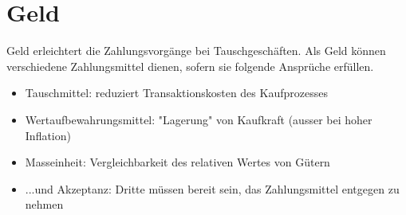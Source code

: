 \section{Geld}
Geld erleichtert die Zahlungsvorgänge bei Tauschgeschäften. Als Geld können verschiedene Zahlungsmittel dienen, sofern sie folgende Ansprüche erfüllen.
\begin{itemize}
	\item Tauschmittel: reduziert Transaktionskosten des Kaufprozesses
	\item Wertaufbewahrungsmittel: "Lagerung" von Kaufkraft (ausser bei hoher Inflation)
	\item Masseinheit: Vergleichbarkeit des relativen Wertes von Gütern
	\item ...und Akzeptanz: Dritte müssen bereit sein, das Zahlungsmittel entgegen zu nehmen
\end{itemize}

